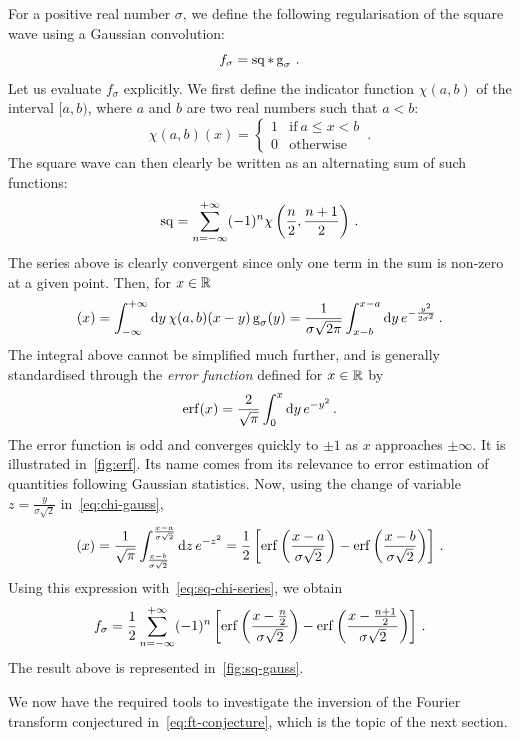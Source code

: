 \begin{example}
	For a positive real number $\sigma$, we define the following regularisation of the
	square wave using a Gaussian convolution:
	\begin{equation}
		f_\sigma=\operatorname{sq}\ast\operatorname{g}_\sigma\,.\label{eq:sq-gauss}
	\end{equation}
	Let us evaluate $f_\sigma$ explicitly. We first define the indicator function
	$\chi(a,b)$ of the interval $[a,b)$, where $a$ and $b$ are two real numbers such that
	$a<b$:
	\begin{equation}
		\chi(a,b)(x)=
		\begin{cases}
			1 & \text{if}~a\leq x<b \\
			0 & \text{otherwise}
		\end{cases}\,.
	\end{equation}
	The square wave can then clearly be written as an alternating sum of such functions:
	\begin{equation}
		\operatorname{sq}=\sum_{n=-\infty}^{+\infty}(-1)^{n}\chi\left(\frac{n}{2},\frac{n+1}{2}\right)\,.
		\label{eq:sq-chi-series}
	\end{equation}
	The series above is clearly convergent since only one term in the sum is non-zero at a
	given point. Then, for $x\in\mathbb{R}$
	\begin{equation}
		[\chi(a,b)\ast\gauss_\sigma](x)=\intr{y}\chi(a,b)(x-y)\gauss_\sigma(y)
		=\frac{1}{\sigma\sqrt{2\pi}}\int_{x-b}^{x-a}\diff y\,e^{-\frac{y^2}{2\sigma^2}}\,.
		\label{eq:chi-gauss}
	\end{equation}
	The integral above cannot be simplified much further, and is generally standardised
	through the \emph{error function} defined for $x\in\mathbb{R}$ by
	\begin{equation}
		\operatorname{erf}(x)=\frac{2}{\sqrt{\pi}}\int_0^x\mathrm{d} y\,e^{-y^2}\,.\label{eq:erf}
	\end{equation}
	The error function is odd and converges quickly to $\pm 1$ as $x$ approaches
	$\pm\infty$. It is illustrated in~\cref{fig:erf}. Its name comes from its relevance to
	error estimation of quantities following Gaussian statistics. Now, using the change of
	variable $z=\frac{y}{\sigma\sqrt{2}}$ in~\cref{eq:chi-gauss},
	\begin{equation}
		[\chi(a,b)\ast\gauss_\sigma](x)=\frac{1}{\sqrt{\pi}}
		\int_{\frac{x-b}{\sigma\sqrt{2}}}^{\frac{x-a}{\sigma\sqrt{2}}}\diff z\,e^{-z^2}
		=\frac{1}{2}\left[\erf\left(\frac{x-a}{\sigma\sqrt{2}}\right)
			-\erf\left(\frac{x-b}{\sigma\sqrt{2}}\right)\right]\,.
	\end{equation}
	Using this expression with~\cref{eq:sq-chi-series}, we obtain
	\begin{equation}
		f_\sigma=\frac{1}{2}\sum_{n=-\infty}^{+\infty}(-1)^{n}
		\left[\operatorname{erf}\bigg(\frac{x-\frac{n}{2}}{\sigma\sqrt{2}}\bigg)
			-\operatorname{erf}\bigg(\frac{x-\frac{n+1}{2}}{\sigma\sqrt{2}}\bigg)\right]\,.
		\label{eq:sq-gauss-exp}
	\end{equation}
	The result above is represented in~\cref{fig:sq-gauss}.
\end{example}
We now have the required tools to investigate the inversion of the Fourier transform
conjectured in~\cref{eq:ft-conjecture}, which is the topic of the next section.
